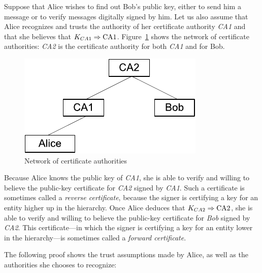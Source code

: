 \begin{example}
\label{ex:ca-chains}
Suppose that Alice wishes to find out Bob's public key, either to send him a
message or to verify messages digitally signed by him.  Let us also
assume that Alice recognizes and trusts the authority of her certificate
authority \emph{CA1} and that she believes that $K_{CA1} \Rightarrow
\textrm{CA1}$.  Figure~\ref{fig:cert authorities} shows the network of
certificate authorities: \emph{CA2}
is the certificate authority for both \emph{CA1} and for Bob.

\begin{figure}[tbp]
  \centering
  \includegraphics{Figures/pki/CA}
  \caption{Network of certificate authorities}
  \label{fig:cert authorities}
\end{figure}

Because Alice knows the public key of \emph{CA1}, she is able to
verify and willing to believe the public-key certificate for
\emph{CA2} signed by \emph{CA1}.  Such a certificate is sometimes
called a \emph{reverse certificate},
because the signer is certifying a key for an entity higher up in the
hierarchy.  Once Alice deduces that $K_{CA2} \Rightarrow \textrm{CA2}$,
she is able to verify and willing to believe the public-key
certificate for \emph{Bob} signed by \emph{CA2}.  This
certificate---in which the signer is certifying a key for an entity
lower in the hierarchy---is sometimes called a \emph{forward certificate}.

The following proof shows the trust assumptions made by Alice, as well as
the authorities she chooses to recognize: 


\end{example}
